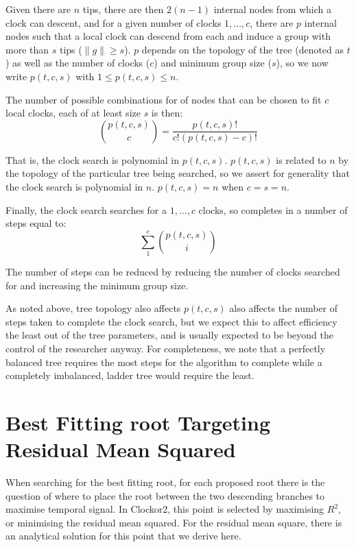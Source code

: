 \documentclass{article}
\begin{document}
Given there are $n$ tips, there are then $2(n-1)$ internal nodes from which a clock can descent, and for a given number of clocks $1,...,c$, there are $p$ internal nodes such that a local clock can descend from each and induce a group with more than $s$ tips ($\|g\| \ge s$). $p$ depends on the topology of the tree (denoted as $t$) as well as the number of clocks ($c$) and minimum group size ($s$), so we now write $p(t,c,s)$ with $1 \le p(t,c,s) \le n$.

The number of possible combinations for of nodes that can be chosen to fit $c$ local clocks, each of at least size $s$ is then:
\begin{equation}
    \binom{p(t,c,s)}{c} = \frac{p(t,c,s)!}{c!(p(t,c,s)-c)!}
\end{equation}

That is, the clock search is polynomial in $p(t,c,s)$. $p(t,c,s)$ is related to $n$ by the topology of the particular tree being searched, so we assert for generality that the clock search is polynomial in $n$. $p(t,c,s) = n$ when $c = s = n$.

Finally, the clock search searches for a $1,...,c$ clocks, so completes in a number of steps equal to:
\begin{equation}
    \sum_{1}^{c} \binom{p(t,c,s)}{i}
\end{equation}

The number of steps can be reduced by reducing the number of clocks searched for and increasing the minimum group size.

As noted above, tree topology also affects $p(t,c,s)$ also affects the number of steps taken to complete the clock search, but we expect this to affect efficiency the least out of the tree parameters, and is usually expected to be beyond the control of the researcher anyway. For completeness, we note that a perfectly balanced tree requires the most steps for the algorithm to complete while a completely imbalanced, ladder tree would require the least.

\section{Best Fitting root Targeting Residual Mean Squared}
When searching for the best fitting root, for each proposed root there is the question of where to place the root between the two descending branches to maximise temporal signal. In Clockor2, this point is selected by maximising $R^2$, or minimising the residual mean squared. For the residual mean square, there is an analytical solution for this point that we derive here.
\end{document}
